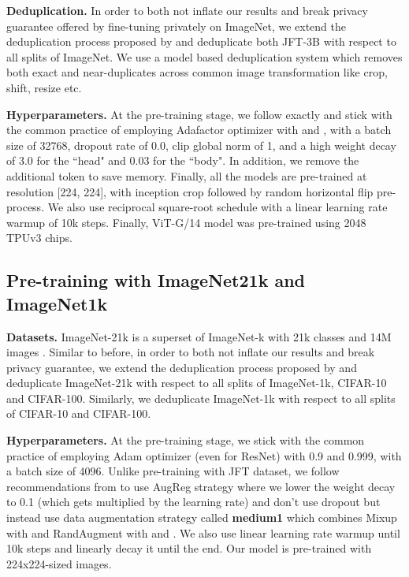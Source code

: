 \documentclass[letterpaper]{article} \usepackage{fullpage}
\begin{document}
\textbf{Deduplication.} In order to both not inflate our results and break privacy guarantee offered by fine-tuning privately on ImageNet, we extend the deduplication process proposed by \cite{bit-paper} and deduplicate both JFT-3B with respect to all splits of ImageNet. We use a model based deduplication system which removes both exact and near-duplicates across common image transformation like crop, shift, resize etc.

\textbf{Hyperparameters.}
At the pre-training stage, we follow \cite{zhai2021scaling} exactly and stick with the common practice of employing Adafactor optimizer with  and , with a batch size of 32768, dropout rate of 0.0, clip global norm of 1, and a high weight decay of 3.0 for the ``head" and 0.03 for the ``body". In addition, we remove the additional  token to save memory. Finally, all the models are pre-trained at resolution [224, 224], with inception crop followed by random horizontal flip pre-process. We also use reciprocal square-root schedule with a linear learning rate warmup of 10k steps. Finally, ViT-G/14 model was pre-trained using 2048 TPUv3 chips.

\subsection{Pre-training with ImageNet21k and ImageNet1k}
\label{sec:i21k}

\textbf{Datasets.} ImageNet-21k is a superset of ImageNet-k with 21k classes and 14M images \citep{deng2009imagenet}. Similar to before, in order to both not inflate our results and break privacy guarantee, we extend the deduplication process proposed by \cite{bit-paper} and deduplicate ImageNet-21k with respect to all splits of ImageNet-1k, CIFAR-10 and CIFAR-100. Similarly, we deduplicate ImageNet-1k with respect to all splits of CIFAR-10 and CIFAR-100.

\textbf{Hyperparameters.}
At the pre-training stage, we stick with the common practice of employing Adam optimizer (even for ResNet) with  0.9 and  0.999, with a batch size of 4096. Unlike pre-training with JFT dataset, we follow recommendations from \cite{augreg_steiner2021train} to use AugReg strategy where we lower the weight decay to 0.1 (which gets multiplied by the learning rate) and don't use dropout but instead use data augmentation strategy called \textbf{medium1} which combines Mixup with  \citep{zhang2017mixup} and RandAugment with  and  \citep{randugment2020}. We also use linear learning rate warmup until 10k steps and linearly decay it until the end. Our model is pre-trained with 224x224-sized images.
\end{document}
